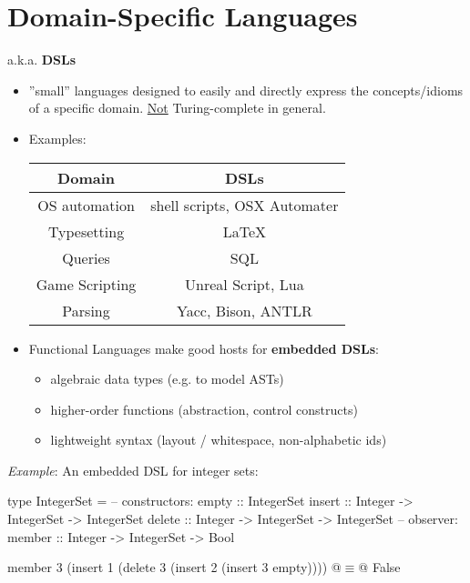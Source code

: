 


\section{Domain-Specific Languages} %
\label{cha:domain_specific_languages}
a.k.a. \textbf{DSLs}

\begin{itemize}
    \item ''small'' languages designed to easily and directly express the concepts/idioms of a specific domain. \underline{Not} Turing-complete in general.
    \item Examples:
        \begin{center}\begin{tabular}{|c|c|}\hline
        \rowcolor{grau} Domain          & DSLs                                  \\\hline
                        OS automation   & shell scripts, OSX Automater          \\\hline
                        Typesetting     & \LaTeX                                \\\hline
                        Queries         & SQL                                   \\\hline
                        Game Scripting  & Unreal Script, Lua                    \\\hline
                        Parsing         & Yacc, Bison, ANTLR                    \\\hline
        \end{tabular}\end{center}
    \item Functional Languages make good hosts for \textbf{embedded DSLs}:
        \begin{itemize}
            \item algebraic data types (e.g. to model ASTs)
            \item higher-order functions (abstraction, control constructs)
            \item lightweight syntax (layout / whitespace, non-alphabetic ids)
        \end{itemize}
\end{itemize}

\textit{Example}: An embedded DSL for integer sets:\\
\begin{Haskell}
type IntegerSet = 
    -- constructors:
    empty :: IntegerSet
    insert :: Integer -> IntegerSet -> IntegerSet
    delete :: Integer -> IntegerSet -> IntegerSet
    -- observer:
    member :: Integer -> IntegerSet -> Bool

member 3 (insert 1 (delete 3 (insert 2 (insert 3 empty))))
    @$\equiv$@ False
\end{Haskell}

